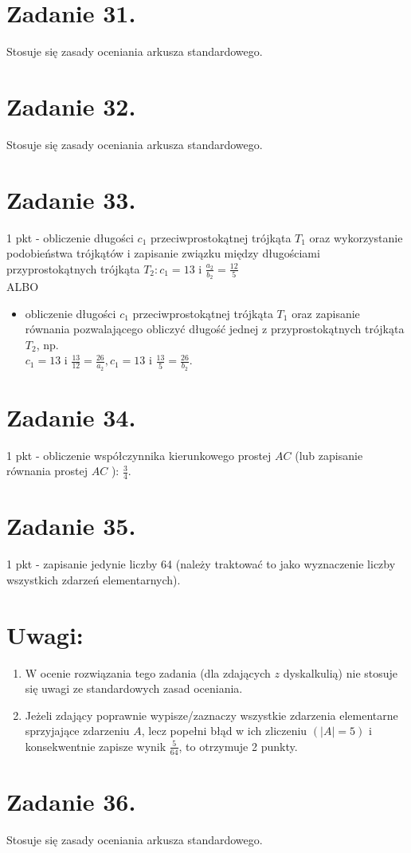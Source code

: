 \documentclass[10pt]{article}
\begin{document}
\section*{Zadanie 31.}
Stosuje się zasady oceniania arkusza standardowego.

\section*{Zadanie 32.}
Stosuje się zasady oceniania arkusza standardowego.

\section*{Zadanie 33.}
1 pkt - obliczenie długości $c_{1}$ przeciwprostokątnej trójkąta $T_{1}$ oraz wykorzystanie podobieństwa trójkątów i zapisanie związku między długościami przyprostokątnych trójkąta $T_{2}: c_{1}=13$ i $\frac{a_{2}}{b_{2}}=\frac{12}{5}$\\
ALBO

\begin{itemize}
  \item obliczenie długości $c_{1}$ przeciwprostokątnej trójkąta $T_{1}$ oraz zapisanie równania pozwalającego obliczyć długość jednej z przyprostokątnych trójkąta $T_{2}$, np.\\
$c_{1}=13$ i $\frac{13}{12}=\frac{26}{a_{2}}, c_{1}=13$ i $\frac{13}{5}=\frac{26}{b_{2}}$.
\end{itemize}

\section*{Zadanie 34.}
1 pkt - obliczenie współczynnika kierunkowego prostej $A C$ (lub zapisanie równania prostej $A C$ ): $\frac{3}{4}$.

\section*{Zadanie 35.}
1 pkt - zapisanie jedynie liczby 64 (należy traktować to jako wyznaczenie liczby wszystkich zdarzeń elementarnych).

\section*{Uwagi:}
\begin{enumerate}
  \item W ocenie rozwiązania tego zadania (dla zdających $z$ dyskalkulią) nie stosuje się uwagi ze standardowych zasad oceniania.
  \item Jeżeli zdający poprawnie wypisze/zaznaczy wszystkie zdarzenia elementarne sprzyjające zdarzeniu $A$, lecz popełni błąd w ich zliczeniu $(|A|=5)$ i konsekwentnie zapisze wynik $\frac{5}{64}$, to otrzymuje 2 punkty.
\end{enumerate}

\section*{Zadanie 36.}
Stosuje się zasady oceniania arkusza standardowego.
\end{document}
